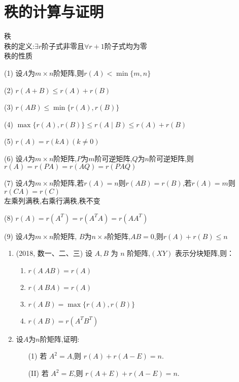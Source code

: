 \documentclass[12pt, a4paper, oneside, UTF8]{ctexbook}
\begin{document}
\section{秩的计算与证明}
\begin{remark} 秩 \\
    秩的定义:$\exists r$阶子式非零且$\forall r+1$阶子式均为零 \\
    秩的性质
    \item[(1)] 设$A$为$m\times n$阶矩阵,则$r(A)<\min\{m,n\}$
    \item[(2)] $r(A+B)\leq r(A)+r(B)$
    \item[(3)] $r(AB)\leq\min\{r(A),r(B)\}$
    \item[(4)] $\max\{r(A),r(B)\}\leq r(A\mid B)\leq r(A) + r(B)$
    \item[(5)] $r(A)=r(kA)(k\neq 0)$
    \item[(6)] 设$A$为$m\times n$阶矩阵,$P$为$m$阶可逆矩阵,$Q$为$n$阶可逆矩阵,则
    $r(A)=r(PA)=r(AQ)=r(PAQ)$
    \item[(7)] 设$A$为$m\times n$阶矩阵,若$r(A)=n$则$r(AB)=r(B)$,若$r(A)=m$则$r(CA)=r(C)$ \\
    左乘列满秩,右乘行满秩,秩不变
    \item[(8)] $r(A)=r(A^T)=r(A^TA)=r(AA^T)$
    \item[(9)] 设$A$为$m\times n$阶矩阵, $B$为$n\times s$阶矩阵,$AB=0$,则$r(A)+r(B)\leq n$
\end{remark}
\begin{enumerate}[label=\arabic*.,start=7]
    \item (2018, 数一、二、三) 设 $ A, B $ 为 $ n $ 阶矩阵,$ (XY) $ 表示分块矩阵,则：
    \begin{enumerate}
        \item $ r(A\ AB) = r(A) $
        \item $ r(A\ BA) = r(A) $
        \item $ r(A\ B) = \max\{r(A), r(B)\} $
        \item $ r(A\ B) = r(A^T B^T) $
    \end{enumerate}
    
    \begin{solution}
    \newpage
    \end{solution}
    \item 设$A$为$n$阶矩阵,证明:
    \begin{enumerate}
        \item [(1)] 若 $ A^2 = A $,则 $ r(A) + r(A - E) = n $.
        \item [(II)] 若 $ A^2 = E $,则 $ r(A + E) + r(A - E) = n $.
    \end{enumerate}
    
    \begin{solution}
    \newpage
    \end{solution}
\end{enumerate}
\end{document}
